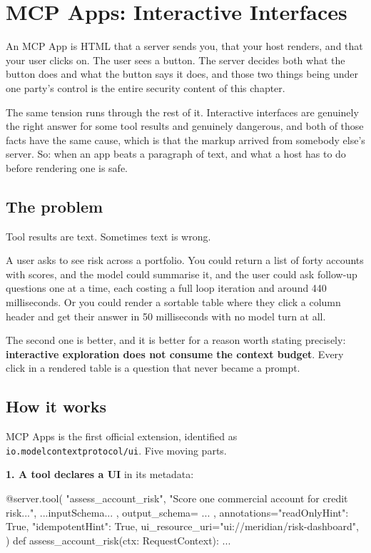 \chapter{MCP Apps: Interactive Interfaces}
\label{ch:apps}

An MCP App is HTML that a server sends you, that your host renders, and that
your user clicks on. The user sees a button. The server decides both what the
button does and what the button says it does, and those two things being under
one party's control is the entire security content of this chapter.

The same tension runs through the rest of it. Interactive interfaces are
genuinely the right answer for some tool results and genuinely dangerous, and
both of those facts have the same cause, which is that the markup arrived from
somebody else's server. So: when an app beats a paragraph of text, and what a
host has to do before rendering one is safe.

\section{The problem}

Tool results are text. Sometimes text is wrong.

A user asks to see risk across a portfolio. You could return a list of forty
accounts with scores, and the model could summarise it, and the user could ask
follow-up questions one at a time, each costing a full loop iteration and around
440 milliseconds. Or you could render a sortable table where they click a column
header and get their answer in 50 milliseconds with no model turn at all.

The second one is better, and it is better for a reason worth stating precisely:
\textbf{interactive exploration does not consume the context budget}. Every
click in a rendered table is a question that never became a prompt.

\section{How it works}

MCP Apps is the first official extension, identified as
\texttt{io.modelcontextprotocol/ui}. Five moving parts.

\textbf{1. A tool declares a UI} in its metadata:

\begin{py}
@server.tool(
    "assess_account_risk",
    "Score one commercial account for credit risk...",
    { ...inputSchema... },
    output_schema={ ... },
    annotations={"readOnlyHint": True, "idempotentHint": True},
    ui_resource_uri="ui://meridian/risk-dashboard",
)
def assess_account_risk(ctx: RequestContext):
    ...
\end{py}

